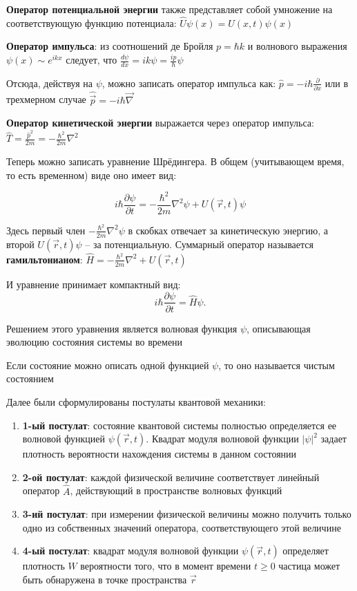 \textbf{Оператор потенциальной энергии} также представляет собой умножение на соответствующую функцию потенциала: $\hat{U}\psi(x) = U(x, t)\psi(x)$

\textbf{Оператор импульса}: из соотношений де Бройля $p = \hbar k$ и волнового выражения $\psi(x) \sim e^{ikx}$ следует, что $\frac{d\psi}{dx} = i k \psi = \frac{i p}{\hbar}\psi$

Отсюда, действуя на $\psi$, можно записать оператор импульса как: $\hat{p} = - i \hbar \frac{\partial}{\partial x}$ или в трехмерном случае $\hat{\vec{p}} = - i \hbar \vec{\nabla}$

\textbf{Оператор кинетической энергии} выражается через оператор импульса: $\hat{T} = \frac{\hat{p}^2}{2m} = -\frac{\hbar^2}{2m}\nabla^2$

\mediumvspace

Теперь можно записать уравнение Шрёдингера. В общем (учитывающем время, то есть временном) виде оно имеет вид:

\[
i\hbar \frac{\partial \psi}{\partial t} = -\frac{\hbar^2}{2m}\nabla^2 \psi + U(\vec r, t)\psi
\]

Здесь первый член $-\frac{\hbar^2}{2m}\nabla^2 \psi$ в скобках отвечает за кинетическую энергию, а второй $U(\vec r, t) \psi$ -- за потенциальную. Суммарный оператор называется \textbf{гамильтонианом}: $\hat{H} = -\frac{\hbar^2}{2m}\nabla^2 + U(\vec r, t)$

И уравнение принимает компактный вид:
\[
i\hbar \frac{\partial \psi}{\partial t} = \hat{H}\psi.
\]

\mediumvspace

Решением этого уравнения является волновая функция $\psi$, описывающая эволюцию состояния системы во времени

Если состояние можно описать одной функцией $\psi$, то оно называется чистым состоянием

\mediumvspace

Далее были сформулированы постулаты квантовой механики:

\begin{enumerate}
    \item \textbf{1-ый постулат}: 
    состояние квантовой системы полностью определяется ее волновой функцией $\psi(\vec r, t)$.  
    Квадрат модуля волновой функции $|\psi|^2$ задает плотность вероятности нахождения системы в данном состоянии
    
    \item \textbf{2-ой постулат}:
    каждой физической величине соответствует линейный оператор $\hat{A}$, действующий в пространстве волновых функций
    
    \item \textbf{3-ий постулат}: 
    при измерении физической величины можно получить только одно из собственных значений оператора, соответствующего этой величине
    
    \item \textbf{4-ый постулат}:
    квадрат модуля волновой функции $\psi(\vec r, t)$
    определяет плотность $W$ вероятности того, что в момент времени $t \geq 0$ частица может быть обнаружена в точке пространства $\vec r$ 
\end{enumerate}

